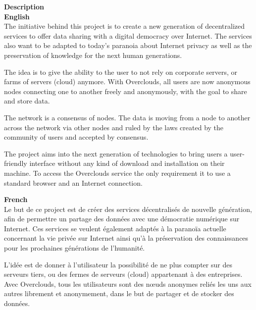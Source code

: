 \begin{titlepage}
{ \huge \bfseries Description}\\[0.2cm]

{ \bfseries English}\\[0.2cm]

The initiative behind this project is to create a new generation of decentralized services to offer data sharing with a digital democracy over Internet. The services also want to be adapted to today's paranoia about Internet privacy as well as the preservation of knowledge for the next human generations.

The idea is to give the ability to the user to not rely on corporate servers, or farms of servers (cloud) anymore. With Overclouds, all users are now anonymous nodes connecting one to another freely and anonymously, with the goal to share and store data.

The network is a consensus of nodes. The data is moving from a node to another across the network via other nodes and ruled by the laws created by the community of users and accepted by consensus.

The project aims into the next generation of technologies to bring users a user-friendly interface without any kind of download and installation on their machine. To access the Overclouds service the only requirement it to use a standard browser and an Internet connection.

\clearpage
{ \bfseries French}\\[0.2cm]

Le but de ce project est de créer des services décentralisés de nouvelle génération, afin de permettre un partage des données avec une démocratie numérique sur Internet. Ces services se veulent également adaptés à la paranoïa actuelle concernant la vie privée sur Internet ainsi qu'à la préservation des connaissances pour les prochaines générations de l'humanité.

L'idée est de donner à l'utilisateur la possibilité de ne plus compter sur des serveurs tiers, ou des fermes de serveurs (cloud) appartenant à des entreprises. Avec Overclouds, tous les utilisateurs sont des nœuds anonymes reliés les uns aux autres librement et anonymement, dans le but de partager et de stocker des données.


\end{titlepage}
